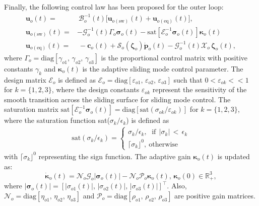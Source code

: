 \documentclass[lettersize,journal]{IEEEtran}
\begin{document}
Finally, the following control law has been proposed for the outer loop:
\begin{align} \label{control law for outer loop: equation}
    \boldsymbol{u}_o(t) =&~ \mathcal{B}_o^{-1}(t) \big[ \boldsymbol{u}_{o(\text{sw})}(t) + \boldsymbol{u}_{o(\text{eq})}(t) \big], \nonumber \\
    \boldsymbol{u}_{o(\text{sw})}(t) =& - \mathcal{G}_o^{-1}(t) \Gamma_o \boldsymbol{\sigma}_o(t) - \text{sat}[ \mathcal{E}_o^{-1}\boldsymbol{\sigma}_o(t)] \boldsymbol{\kappa}_o(t) \nonumber\\
    \boldsymbol{u}_{o(\text{eq})}(t) =&~ - \boldsymbol{c}_o(t) + \mathcal{S}_o(\boldsymbol{\zeta}_o) \dot{\boldsymbol{p}}_o(t) - \mathcal{G}_o^{-1}(t) \mathcal{X}_o\,\boldsymbol{\zeta}_o(t),
\end{align}
where $\Gamma_o = \text{diag}[\gamma_{o 1},\, \gamma_{o 2},\, \gamma_{o 3}]$  is the proportional control matrix with positive constants $\gamma_k$ and $\boldsymbol{\kappa}_o(t)$ is the adaptive sliding mode control parameter.
The design matrix $\mathcal{E}_o$ is defined as $\mathcal{E}_o = \text{diag}[\varepsilon_{o 1}, \, \varepsilon_{o 2}, \, \varepsilon_{o 3}]$ such that $0 < \varepsilon_{ok} << 1$ for $k = \{1, 2, 3\}$, where the design constants $\varepsilon_{ok}$ represent the sensitivity of the smooth transition across the sliding surface for sliding mode control.
The saturation matrix $\text{sat}[ \mathcal{E}_o^{-1}\boldsymbol{\sigma}_o(t)] = \text{diag}[\text{sat}(\sigma_{ok}/\varepsilon_{ok})]$ for $k = \{1, 2, 3\}$, where the saturation function sat($\sigma_k/\epsilon_k$) is defined as
\begin{align}
\label{sat_fn}
\text{sat}(\sigma_k/\epsilon_k)=\begin{cases}
    \sigma_k/\epsilon_k,~~\,\text{if}~~\rvert\sigma_k\rvert\,<\,\epsilon_k\\
    \lceil \sigma_k\rfloor^0,~\text{otherwise}
    \end{cases}
\end{align}
with $\lceil \sigma_k \rfloor^0$ representing the sign function.
The adaptive gain $\boldsymbol{\kappa}_o(t)$ is updated as:
\begin{equation} \label{adaptive law for outer loop: equation}
    \dot{\boldsymbol{\kappa}}_o(t) =  \mathcal{N}_{o} \mathcal{G}_o \lvert \boldsymbol{\sigma}_o(t) \rvert - \mathcal{N}_{o} \mathcal{P}_{o} \boldsymbol{\kappa}_o(t), \, \boldsymbol{\kappa}_{o}(0)  \in \mathbb{R}_+^3,
\end{equation}
where $\lvert \boldsymbol{\sigma}_o(t) \rvert  = \left[\lvert \sigma_{o 1}(t) \rvert,\, \lvert \sigma_{o 2}(t) \rvert,\, \lvert \sigma_{o 3}(t) \rvert\right]^{\top}$. Also, $\mathcal{N}_{o} = \text{diag}[\eta_{o 1},\, \eta_{o 2},\, \eta_{o 3}]$ and $\mathcal{P}_{o} = \text{diag}[\rho_{o 1},\, \rho_{o 2},\, \rho_{o 3}]$ are positive gain matrices.
\end{document}
